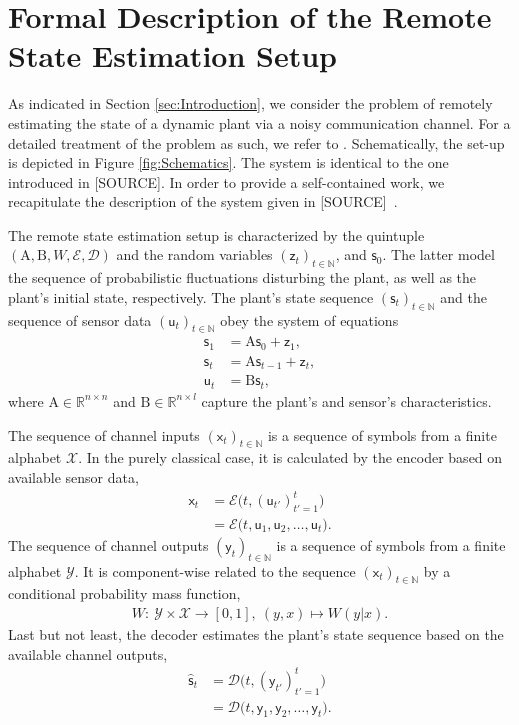 \documentclass[conference]{IEEEtran}
\newcommand{\rx}{\mathsf{x}}
\newcommand{\ry}{\mathsf{y}}
\newcommand{\rs}{\mathsf{s}}
\newcommand{\rz}{\mathsf{z}}
\newcommand{\ru}{\mathsf{u}}
\def\E{{\mathcal E}}
\def\D{{\mathcal D}}
\def\X{{\mathcal X}}
\def\Y{{\mathcal Y}}
\def\NN{{\mathbb N}}
\def\RR{{\mathbb R}}
\def\mA{\bm{\mathrm{A}}}
\def\mB{\bm{\mathrm{B}}}
\newcommand{\sdummy}{{\color{red}[SOURCE]}}
\begin{document}
\section{Formal Description of the Remote State Estimation Setup}
	\noindent As indicated in Section \ref{sec:Introduction}, we consider the problem of remotely estimating the state of a dynamic plant via a noisy communication channel. 
	For a detailed treatment of the problem as such, we refer to \cite{MS07}. Schematically, the set-up is depicted in Figure \ref{fig:Schematics}. 
	The system is identical to the one introduced in \sdummy. In order to provide a self-contained work, we recapitulate the description of the system given in \sdummy~.

	The remote state estimation setup is characterized by the quintuple \((\mA,\mB,W,\E,\D)\) and the random variables \((\rz_t)_{t\in\NN}\), and \(\rs_{0}\). 
	The latter model the sequence of probabilistic fluctuations disturbing the plant, as well as the plant's initial state, respectively. The plant's state sequence \((\rs_t)_{t\in\NN}\) 
	and the sequence of sensor data \((\ru_t)_{t\in\NN}\) obey the system of equations
	\begin{align}	\rs_1    &= \mA \rs_0 + \rz_1, \\ 
					\rs_t    &= \mA \rs_{t-1} + \rz_t,\\ 
					\ru_t    &= \mB \rs_t,
	\end{align}
	where \(\mA\in\RR^{n\times n}\) and \(\mB\in\RR^{n\times l}\) capture the plant's and sensor's characteristics. 

	The sequence of channel inputs \((\rx_t)_{t\in\NN}\) is a sequence
	of symbols from a finite alphabet \(\X\). In the purely classical case, it is calculated by the encoder based on available sensor data,
	\begin{align}	\rx_t   &= \E \big(t, (\ru_{t'})_{t'=1}^{t}\big) \nonumber\\
							&= \E\big(t, \ru_1,\ru_2,\ldots,\ru_t\big).
	\end{align} 
	The sequence of channel outputs \((\ry_t)_{t\in\NN}\) is a sequence
	of symbols from a finite alphabet \(\Y\). It is component-wise related to the sequence \((\rx_t)_{t\in\NN}\) by a conditional probability mass function,
	\begin{align}   \label{eq:CndPrbMass}
					W :~ \Y \times \X \rightarrow [0,1],~(y,x) \mapsto W(y|x).
	\end{align}
	Last but not least, the decoder estimates the plant's state sequence based on the available channel outputs,
	\begin{align}	\hat{\rs}_t  	&= \D \big(t, (\ry_{t'})_{t'=1}^{t}\big) \nonumber\\ 
									&= \D\big(t,\ry_1,\ry_2,\ldots,\ry_t\big).
	\end{align}
\end{document}
